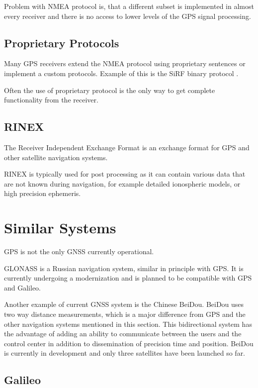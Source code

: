 Problem with NMEA protocol is, that a different subset is implemented in almost every
receiver and there is no access to lower levels of the GPS signal processing.

\subsection{Proprietary Protocols}
Many GPS receivers extend the NMEA protocol using proprietary sentences or
implement a custom protocols.
Example of this is the SiRF binary protocol \cite{sirf-protocol}.

Often the use of proprietary protocol is the only way to get complete functionality from
the receiver.

\subsection{RINEX}

The Receiver Independent Exchange Format \cite{rinex-format} is an exchange format
for GPS and other satellite navigation systems.

RINEX is typically used for post processing as it can contain various data that are not
known during navigation, for example detailed ionospheric models, or high precision ephemeris.

\section{Similar Systems}

GPS is not the only GNSS currently operational.

GLONASS \cite{glonass} is a Russian navigation system, similar in principle with GPS.
It is currently undergoing a modernization and is planned to be compatible with GPS and Galileo.

Another example of current GNSS system is the Chinese BeiDou.
BeiDou uses two way distance measurements, which is a major difference from GPS and the other navigation
systems mentioned in this section.
This bidirectional system has the advantage of adding an ability to communicate between the
users and the control center in addition to dissemination of precision time and position.
BeiDou is currently in development and only three satellites have been launched so far.


\subsection{Galileo}
\label{sec:galileo}

